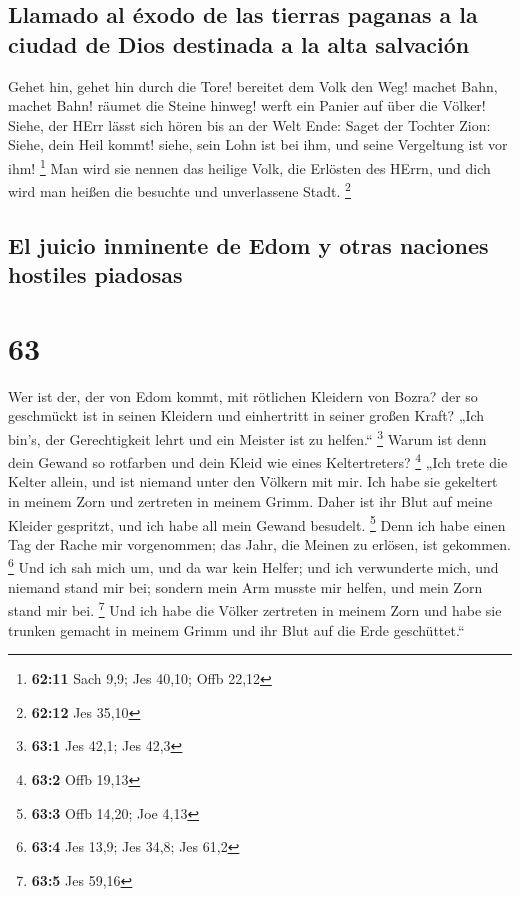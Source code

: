 \hypertarget{llamado-al-uxe9xodo-de-las-tierras-paganas-a-la-ciudad-de-dios-destinada-a-la-alta-salvaciuxf3n}{%
\subsection{Llamado al éxodo de las tierras paganas a la ciudad de Dios
destinada a la alta
salvación}\label{llamado-al-uxe9xodo-de-las-tierras-paganas-a-la-ciudad-de-dios-destinada-a-la-alta-salvaciuxf3n}}

 Gehet hin, gehet hin durch die Tore! bereitet dem Volk
den Weg! machet Bahn, machet Bahn! räumet die Steine hinweg! werft ein
Panier auf über die Völker!  Siehe, der HErr lässt sich
hören bis an der Welt Ende: Saget der Tochter Zion: Siehe, dein Heil
kommt! siehe, sein Lohn ist bei ihm, und seine Vergeltung ist vor ihm!
\footnote{\textbf{62:11} Sach 9,9; Jes 40,10; Offb 22,12}
 Man wird sie nennen das heilige Volk, die Erlösten des
HErrn, und dich wird man heißen die besuchte und unverlassene Stadt.
\footnote{\textbf{62:12} Jes 35,10}

\hypertarget{el-juicio-inminente-de-edom-y-otras-naciones-hostiles-piadosas}{%
\subsection{El juicio inminente de Edom y otras naciones hostiles
piadosas}\label{el-juicio-inminente-de-edom-y-otras-naciones-hostiles-piadosas}}

\hypertarget{section-62}{%
\section{63}\label{section-62}}

 Wer ist der, der von Edom kommt, mit rötlichen Kleidern
von Bozra? der so geschmückt ist in seinen Kleidern und einhertritt in
seiner großen Kraft? „Ich bin's, der Gerechtigkeit lehrt und ein Meister
ist zu helfen.`` \footnote{\textbf{63:1} Jes 42,1; Jes 42,3}
 Warum ist denn dein Gewand so rotfarben und dein Kleid
wie eines Keltertreters? \footnote{\textbf{63:2} Offb 19,13}
 „Ich trete die Kelter allein, und ist niemand unter den
Völkern mit mir. Ich habe sie gekeltert in meinem Zorn und zertreten in
meinem Grimm. Daher ist ihr Blut auf meine Kleider gespritzt, und ich
habe all mein Gewand besudelt. \footnote{\textbf{63:3} Offb 14,20; Joe
  4,13}  Denn ich habe einen Tag der Rache mir
vorgenommen; das Jahr, die Meinen zu erlösen, ist gekommen. \footnote{\textbf{63:4}
  Jes 13,9; Jes 34,8; Jes 61,2}  Und ich sah mich um, und
da war kein Helfer; und ich verwunderte mich, und niemand stand mir bei;
sondern mein Arm musste mir helfen, und mein Zorn stand mir bei.
\footnote{\textbf{63:5} Jes 59,16}  Und ich habe die
Völker zertreten in meinem Zorn und habe sie trunken gemacht in meinem
Grimm und ihr Blut auf die Erde geschüttet.``

